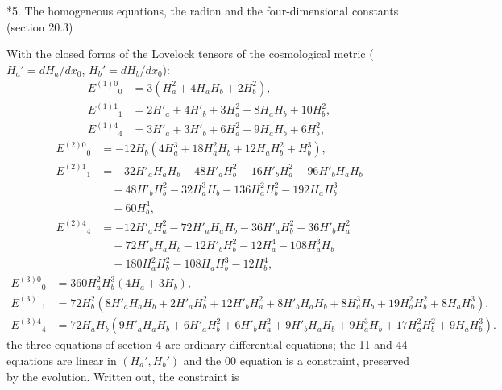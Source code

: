\documentclass[10pt,a4paper]{article}
\makeatletter
\renewcommand\section{\@startsection{section}{1}{\z@}{-3.5ex \@plus -1ex \@minus -.2ex}{2.3ex \@plus.2ex}{\normalfont\Large\bfseries\raggedright}}
\makeatother
\begin{document}
\section*{5. The homogeneous equations, the radion and the four-dimensional constants (section 20.3)}
With the closed forms of the Lovelock tensors of the cosmological metric ($H_a'=dH_a/dx_0$, $H_b'=dH_b/dx_0$):
\begin{align*}
E^{(1)0}{}_0&=3 \left(H_{a}^{2} + 4 H_{a} H_{b} + 2 H_{b}^{2}\right), \\
E^{(1)1}{}_1&=2 H'_{a} + 4 H'_{b} + 3 H_{a}^{2} + 8 H_{a} H_{b} + 10 H_{b}^{2}, \\
E^{(1)4}{}_4&=3 H'_{a} + 3 H'_{b} + 6 H_{a}^{2} + 9 H_{a} H_{b} + 6 H_{b}^{2},
\end{align*}
\begin{align*}
E^{(2)0}{}_0&=- 12 H_{b} \left(4 H_{a}^{3} + 18 H_{a}^{2} H_{b} + 12 H_{a} H_{b}^{2} + H_{b}^{3}\right), \\
E^{(2)1}{}_1&=- 32 H'_{a} H_{a} H_{b} - 48 H'_{a} H_{b}^{2} - 16 H'_{b} H_{a}^{2} - 96 H'_{b} H_{a} H_{b} \\
&\quad - 48 H'_{b} H_{b}^{2} - 32 H_{a}^{3} H_{b} - 136 H_{a}^{2} H_{b}^{2} - 192 H_{a} H_{b}^{3} \\
&\quad - 60 H_{b}^{4}, \\
E^{(2)4}{}_4&=- 12 H'_{a} H_{a}^{2} - 72 H'_{a} H_{a} H_{b} - 36 H'_{a} H_{b}^{2} - 36 H'_{b} H_{a}^{2} \\
&\quad - 72 H'_{b} H_{a} H_{b} - 12 H'_{b} H_{b}^{2} - 12 H_{a}^{4} - 108 H_{a}^{3} H_{b} \\
&\quad - 180 H_{a}^{2} H_{b}^{2} - 108 H_{a} H_{b}^{3} - 12 H_{b}^{4},
\end{align*}
\begin{align*}
E^{(3)0}{}_0&=360 H_{a}^{2} H_{b}^{3} \left(4 H_{a} + 3 H_{b}\right), \\
E^{(3)1}{}_1&=72 H_{b}^{2} \left(8 H'_{a} H_{a} H_{b} + 2 H'_{a} H_{b}^{2} + 12 H'_{b} H_{a}^{2} + 8 H'_{b} H_{a} H_{b} + 8 H_{a}^{3} H_{b} + 19 H_{a}^{2} H_{b}^{2} + 8 H_{a} H_{b}^{3}\right), \\
E^{(3)4}{}_4&=72 H_{a} H_{b} \left(9 H'_{a} H_{a} H_{b} + 6 H'_{a} H_{b}^{2} + 6 H'_{b} H_{a}^{2} + 9 H'_{b} H_{a} H_{b} + 9 H_{a}^{3} H_{b} + 17 H_{a}^{2} H_{b}^{2} + 9 H_{a} H_{b}^{3}\right).
\end{align*}
the three equations of section 4 are ordinary differential equations; the 11 and 44 equations are linear in $(H_a',H_b')$ and the 00 equation is a constraint, preserved by the evolution. Written out, the constraint is
\end{document}
